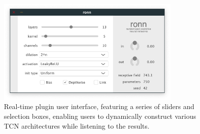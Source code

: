 \documentclass{article}
\begin{document}
\begin{figure}[h] 
  \centering
  \includegraphics[width=0.8\textwidth]{ronn-vst-ui.png}  
  \caption{Real-time plugin user interface, featuring a series of sliders and selection boxes, 
  enabling users to dynamically construct various TCN architectures while listening to the results.}
  \label{fig:ui}
\end{figure}
\end{document}
